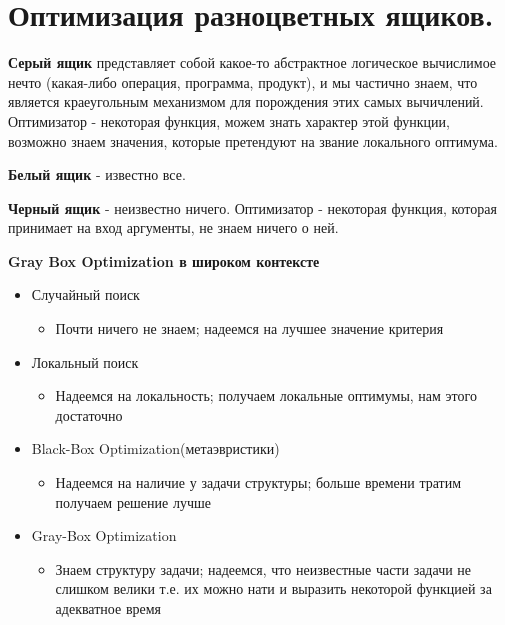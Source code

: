 \section{Оптимизация разноцветных ящиков.}
\textbf{Серый ящик} представляет собой какое-то абстрактное логическое вычислимое нечто (какая-либо операция, программа, продукт), и мы частично знаем, что является краеугольным механизмом для порождения этих самых вычичлений.
Оптимизатор - некоторая функция, можем знать характер этой функции, возможно знаем значения, которые претендуют на звание локального оптимума.

\textbf{Белый ящик} - известно все.

\textbf{Черный ящик} - неизвестно ничего. Оптимизатор - некоторая функция, которая принимает на вход аргументы, не знаем ничего о ней.

\textbf{Gray Box Optimization в широком контексте}
\begin{itemize}
    \item Случайный поиск
    \begin{itemize}
        \item Почти ничего не знаем; надеемся на лучшее значение критерия
    \end{itemize}
     \item Локальный поиск
    \begin{itemize}
        \item Надеемся на локальность; получаем локальные оптимумы, нам этого достаточно
    \end{itemize}
     \item Black-Box Optimization(метаэвристики)
    \begin{itemize}
        \item Надеемся на наличие у задачи структуры; больше времени тратим получаем решение лучше
    \end{itemize}
    \item Gray-Box Optimization
    \begin{itemize}
        \item Знаем структуру задачи; надеемся, что неизвестные части задачи не слишком велики т.е. их можно нати и выразить некоторой функцией за адекватное время
    \end{itemize}
\end{itemize}

